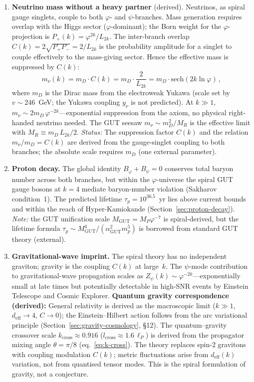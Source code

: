 \documentclass[12pt,a4paper]{article}
\begin{document}
\begin{enumerate}
\item \textbf{Neutrino mass without a heavy partner} (derived).\;  Neutrinos, as spiral gauge singlets, couple to both $\varphi$- and $\psi$-branches.  Mass generation requires overlap with the Higgs sector ($\varphi$-dominant); the Born weight for the $\varphi$-projection is $P_+(k) = \varphi^{2k}/L_{2k}$.  The inter-branch overlap $C(k) = 2\sqrt{P_+ P_-} = 2/L_{2k}$ is the probability amplitude for a singlet to couple effectively to the mass-giving sector.  Hence the effective mass is suppressed by $C(k)$:
\begin{equation}
m_\nu(k) = m_D \cdot C(k) = m_D \cdot \frac{2}{L_{2k}} = m_D \cdot \mathrm{sech}(2k\ln\varphi)\,,
\end{equation}
where $m_D$ is the Dirac mass from the electroweak Yukawa (scale set by $v \sim 246$~GeV; the Yukawa coupling $y_\nu$ is not predicted).  At $k \gg 1$, $m_\nu \sim 2m_D\,\varphi^{-2k}$---exponential suppression from the axiom, no physical right-handed neutrino needed.  The GUT seesaw $m_\nu \sim m_D^2/M_R$ is the effective limit with $M_R \equiv m_D\,L_{2k}/2$.  \emph{Status:} The suppression factor $C(k)$ and the relation $m_\nu/m_D = C(k)$ are derived from the gauge-singlet coupling to both branches; the absolute scale requires $m_D$ (one external parameter).

\item \textbf{Proton decay.}\;  The global identity $B_\varphi + B_\psi = 0$ conserves total baryon number across both branches, but within the $\varphi$-universe the spiral GUT gauge bosons at $k = 4$ mediate baryon-number violation (Sakharov condition~1).  The predicted lifetime $\tau_p = 10^{36.5}$~yr lies above current bounds and within the reach of Hyper-Kamiokande (Section~\ref{sec:proton-decay}).  \emph{Note:} the GUT unification scale $M_{\mathrm{GUT}} = M_P\varphi^{-7}$ is spiral-derived, but the lifetime formula $\tau_p \sim M_{\mathrm{GUT}}^4/(\alpha_{\mathrm{GUT}}^2 m_p^5)$ is borrowed from standard GUT theory (external).

\item \textbf{Gravitational-wave imprint.}\;  The spiral theory has no independent graviton; gravity is the coupling $C(k)$ at large~$k$.  The $\psi$-mode contribution to gravitational-wave propagation scales as $Z_\psi(k) \sim \varphi^{-2k}$---exponentially small at late times but potentially detectable in high-SNR events by Einstein Telescope and Cosmic Explorer.  \textbf{Quantum gravity correspondence (derived):} General relativity is derived as the macroscopic limit ($k \gg 1$, $d_{\mathrm{eff}} \to 4$, $C \to 0$); the Einstein--Hilbert action follows from the arc variational principle (Section~\ref{sec:gravity-cosmology}, \S12). The quantum--gravity crossover scale $k_{\mathrm{cross}} \approx 0.916$ ($l_{\mathrm{cross}} \approx 1.6\,\ell_P$) is derived from the propagator mixing angle $\theta = \pi/8$ (eq.~\ref{eq:k-cross}). The theory replaces spin-2 gravitons with coupling modulation $C(k)$; metric fluctuations arise from $d_{\mathrm{eff}}(k)$ variation, not from quantised tensor modes. This is the spiral formulation of gravity, not a conjecture.
\end{enumerate}
\end{document}
